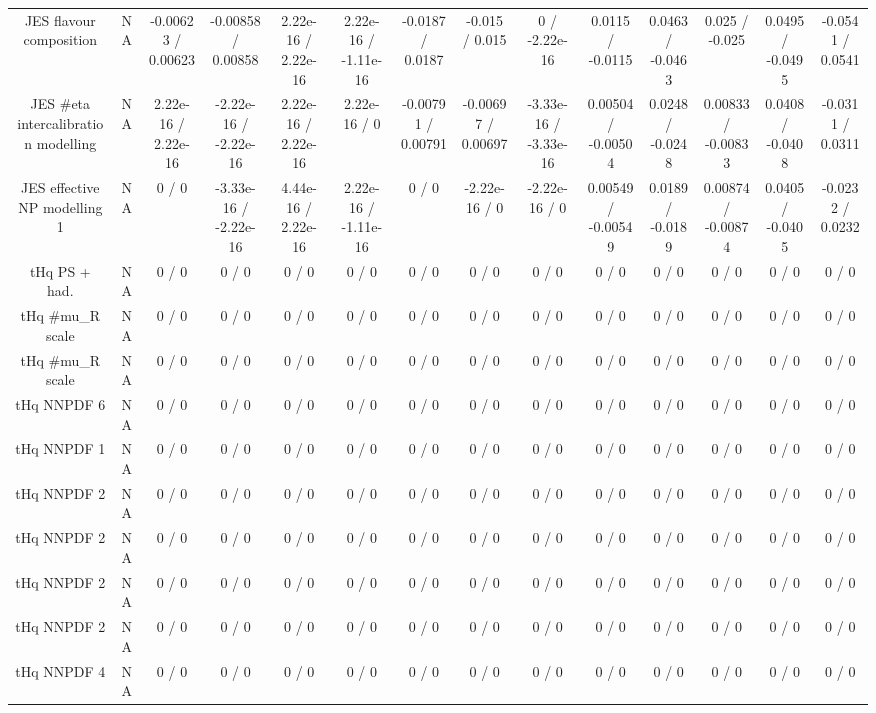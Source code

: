 \documentclass[10pt]{article}
\begin{document}
\begin{table}[htbp]
\begin{center}
\begin{tabular}{|c|c|c|c|c|c|c|c|c|c|c|c|c|c|}
  JES flavour composition &    NA    & -0.00623 / 0.00623 & -0.00858 / 0.00858 & 2.22e-16 / 2.22e-16 & 2.22e-16 / -1.11e-16 & -0.0187 / 0.0187 & -0.015 / 0.015 & 0 / -2.22e-16 & 0.0115 / -0.0115 & 0.0463 / -0.0463 & 0.025 / -0.025 & 0.0495 / -0.0495 & -0.0541 / 0.0541 \\ 
  JES #eta intercalibration modelling &    NA    & 2.22e-16 / 2.22e-16 & -2.22e-16 / -2.22e-16 & 2.22e-16 / 2.22e-16 & 2.22e-16 / 0 & -0.00791 / 0.00791 & -0.00697 / 0.00697 & -3.33e-16 / -3.33e-16 & 0.00504 / -0.00504 & 0.0248 / -0.0248 & 0.00833 / -0.00833 & 0.0408 / -0.0408 & -0.0311 / 0.0311 \\ 
  JES effective NP modelling 1 &    NA    & 0 / 0 & -3.33e-16 / -2.22e-16 & 4.44e-16 / 2.22e-16 & 2.22e-16 / -1.11e-16 & 0 / 0 & -2.22e-16 / 0 & -2.22e-16 / 0 & 0.00549 / -0.00549 & 0.0189 / -0.0189 & 0.00874 / -0.00874 & 0.0405 / -0.0405 & -0.0232 / 0.0232 \\ 
  tHq PS + had. &    NA    & 0 / 0 & 0 / 0 & 0 / 0 & 0 / 0 & 0 / 0 & 0 / 0 & 0 / 0 & 0 / 0 & 0 / 0 & 0 / 0 & 0 / 0 & 0 / 0 \\ 
  tHq #mu_{R} scale &    NA    & 0 / 0 & 0 / 0 & 0 / 0 & 0 / 0 & 0 / 0 & 0 / 0 & 0 / 0 & 0 / 0 & 0 / 0 & 0 / 0 & 0 / 0 & 0 / 0 \\ 
  tHq #mu_{R} scale &    NA    & 0 / 0 & 0 / 0 & 0 / 0 & 0 / 0 & 0 / 0 & 0 / 0 & 0 / 0 & 0 / 0 & 0 / 0 & 0 / 0 & 0 / 0 & 0 / 0 \\ 
  tHq NNPDF 6 &    NA    & 0 / 0 & 0 / 0 & 0 / 0 & 0 / 0 & 0 / 0 & 0 / 0 & 0 / 0 & 0 / 0 & 0 / 0 & 0 / 0 & 0 / 0 & 0 / 0 \\ 
  tHq NNPDF 1 &    NA    & 0 / 0 & 0 / 0 & 0 / 0 & 0 / 0 & 0 / 0 & 0 / 0 & 0 / 0 & 0 / 0 & 0 / 0 & 0 / 0 & 0 / 0 & 0 / 0 \\ 
  tHq NNPDF 2 &    NA    & 0 / 0 & 0 / 0 & 0 / 0 & 0 / 0 & 0 / 0 & 0 / 0 & 0 / 0 & 0 / 0 & 0 / 0 & 0 / 0 & 0 / 0 & 0 / 0 \\ 
  tHq NNPDF 2 &    NA    & 0 / 0 & 0 / 0 & 0 / 0 & 0 / 0 & 0 / 0 & 0 / 0 & 0 / 0 & 0 / 0 & 0 / 0 & 0 / 0 & 0 / 0 & 0 / 0 \\ 
  tHq NNPDF 2 &    NA    & 0 / 0 & 0 / 0 & 0 / 0 & 0 / 0 & 0 / 0 & 0 / 0 & 0 / 0 & 0 / 0 & 0 / 0 & 0 / 0 & 0 / 0 & 0 / 0 \\ 
  tHq NNPDF 2 &    NA    & 0 / 0 & 0 / 0 & 0 / 0 & 0 / 0 & 0 / 0 & 0 / 0 & 0 / 0 & 0 / 0 & 0 / 0 & 0 / 0 & 0 / 0 & 0 / 0 \\ 
  tHq NNPDF 4 &    NA    & 0 / 0 & 0 / 0 & 0 / 0 & 0 / 0 & 0 / 0 & 0 / 0 & 0 / 0 & 0 / 0 & 0 / 0 & 0 / 0 & 0 / 0 & 0 / 0 \\ 

\end{tabular}
\end{center}
\end{table}
\end{document}
